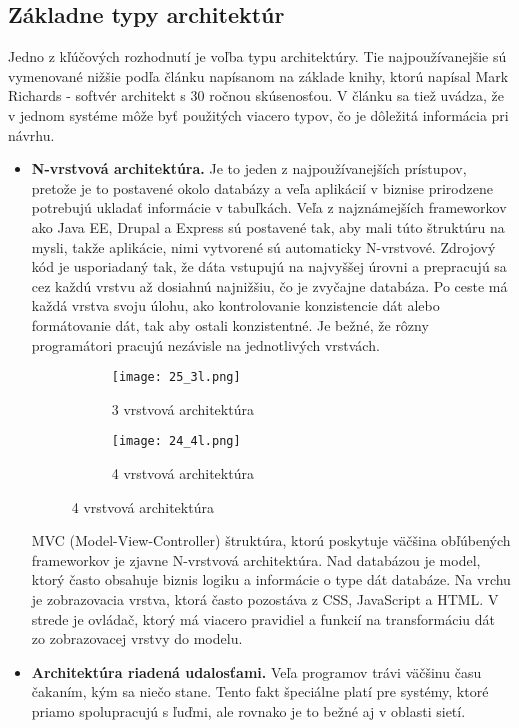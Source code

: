 \subsection{Základne typy architektúr}
Jedno z kľúčových rozhodnutí je voľba typu architektúry. Tie najpoužívanejšie sú vymenované nižšie podľa článku \cite{IOT05} napísanom na základe knihy\cite{IOT08}, ktorú napísal Mark Richards - softvér architekt s 30 ročnou skúsenosťou. V článku sa tiež uvádza, že v jednom systéme môže byť použitých viacero typov, čo je  dôležitá informácia pri návrhu.
\begin{itemize}
 \item \textbf{ N-vrstvová architektúra.} Je to jeden z najpoužívanejších prístupov, pretože je to postavené okolo databázy a veľa aplikácií v biznise prirodzene potrebujú ukladať informácie v tabuľkách. \indent Veľa z najznámejších frameworkov ako Java EE, Drupal a Express sú postavené tak, aby mali túto štruktúru na mysli, takže aplikácie, nimi vytvorené sú automaticky N-vrstvové.
\indent Zdrojový kód je usporiadaný tak, že dáta vstupujú na najvyššej úrovni a prepracujú sa cez každú vrstvu až dosiahnú najnižšiu, čo je zvyčajne databáza. Po ceste má každá vrstva svoju úlohu, ako kontrolovanie konzistencie dát alebo formátovanie dát, tak aby ostali konzistentné. Je bežné, že rôzny programátori pracujú nezávisle na jednotlivých vrstvách.
\begin{figure}[!htbp]
\centering
\begin{subfigure}{0.5\linewidth}
\texttt{[image: 25\_3l.png]}
\caption{3 vrstvová architektúra \cite{IOT07}}
\label{25_3l}
\end{subfigure}%
\begin{subfigure}{0.5\linewidth}
\texttt{[image: 24\_4l.png]}
\caption{4 vrstvová architektúra\cite{IOT06}}
\label{24_4l}
\end{subfigure}
\end{figure}
MVC (Model-View-Controller) štruktúra, ktorú poskytuje väčšina obľúbených frameworkov je zjavne N-vrstvová architektúra. Nad databázou je model, ktorý často obsahuje biznis logiku a informácie o type dát databáze. Na vrchu je zobrazovacia vrstva, ktorá často pozostáva z CSS, JavaScript a HTML. V strede je ovládač, ktorý má viacero pravidiel a funkcií na transformáciu dát zo zobrazovacej vrstvy do modelu.
 \item \textbf{ Architektúra riadená udalosťami.} Veľa programov trávi väčšinu času čakaním, kým sa niečo stane. Tento fakt špeciálne platí pre systémy, ktoré priamo spolupracujú  s ľuďmi, ale rovnako je to bežné aj v oblasti sietí.

\end{itemize}

